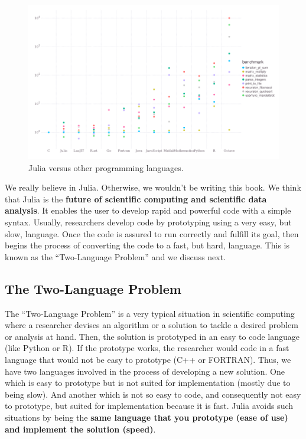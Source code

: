 \documentclass[
  notoc %
]{tufte-book}
\begin{document}
\begin{figure}
\hypertarget{fig:benchmarks}{%
\centering
\includegraphics{images/benchmarks.png}
\caption{Julia versus other programming
languages.}\label{fig:benchmarks}
}
\end{figure}

We really believe in Julia. Otherwise, we wouldn't be writing this book.
We think that Julia is the \textbf{future of scientific computing and
scientific data analysis}. It enables the user to develop rapid and
powerful code with a simple syntax. Usually, researchers develop code by
prototyping using a very easy, but slow, language. Once the code is
assured to run correctly and fulfill its goal, then begins the process
of converting the code to a fast, but hard, language. This is known as
the ``Two-Language Problem'' and we discuss next.

\hypertarget{sec:two_language}{%
\subsection{The Two-Language Problem}\label{sec:two_language}}

The ``Two-Language Problem'' is a very typical situation in scientific
computing where a researcher devises an algorithm or a solution to
tackle a desired problem or analysis at hand. Then, the solution is
prototyped in an easy to code language (like Python or R). If the
prototype works, the researcher would code in a fast language that would
not be easy to prototype (C++ or FORTRAN). Thus, we have two languages
involved in the process of developing a new solution. One which is easy
to prototype but is not suited for implementation (mostly due to being
slow). And another which is not so easy to code, and consequently not
easy to prototype, but suited for implementation because it is fast.
Julia avoids such situations by being the \textbf{same language that you
prototype (ease of use) and implement the solution (speed)}.
\end{document}
